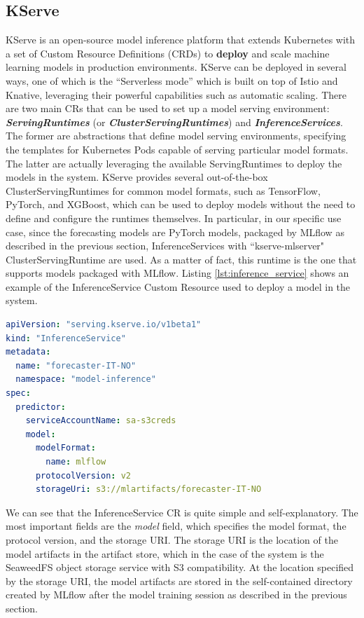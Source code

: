 \subsection{KServe}
\label{sec:kserve}

KServe is an open-source model inference platform that extends Kubernetes with a set of Custom Resource Definitions (CRDs) to \textbf{deploy} and scale machine learning models in production environments.
KServe can be deployed in several ways, one of which is the ``Serverless mode'' which is built on top of Istio and Knative, leveraging their powerful capabilities such as automatic scaling. 
There are two main CRs that can be used to set up a model serving environment: \textit{\textbf{ServingRuntimes}} (or \textit{\textbf{ClusterServingRuntimes}}) and \textit{\textbf{InferenceServices}}.
The former are abstractions that define model serving environments, specifying the templates for Kubernetes Pods capable of serving particular model formats. The latter are actually leveraging the available ServingRuntimes to deploy the models in the system.  
KServe provides several out-of-the-box ClusterServingRuntimes for common model formats, such as TensorFlow, PyTorch, and XGBoost, which can be used to deploy models without the need to define and configure the runtimes themselves.
In particular, in our specific use case, since the forecasting models are PyTorch models, packaged by MLflow as described in the previous section, InferenceServices with ``kserve-mlserver" ClusterServingRuntime are used. 
As a matter of fact, this runtime is the one that supports models packaged with MLflow.
Listing \ref{lst:inference_service} shows an example of the InferenceService Custom Resource used to deploy a model in the system. \\

\begin{lstlisting}[language=yaml, caption={InferenceService Custom Resource example}, label={lst:inference_service}]
apiVersion: "serving.kserve.io/v1beta1"
kind: "InferenceService"
metadata:
  name: "forecaster-IT-NO"
  namespace: "model-inference"
spec:
  predictor:
    serviceAccountName: sa-s3creds
    model:
      modelFormat:
        name: mlflow
      protocolVersion: v2  
      storageUri: s3://mlartifacts/forecaster-IT-NO
\end{lstlisting}


We can see that the InferenceService CR is quite simple and self-explanatory. 
The most important fields are the \textit{model} field, which specifies the model format, the protocol version, and the storage URI.
The storage URI is the location of the model artifacts in the artifact store, which in the case of the system is the SeaweedFS object storage service with S3 compatibility. 
At the location specified by the storage URI, the model artifacts are stored in the self-contained directory created by MLflow after the model training session as described in the previous section.





